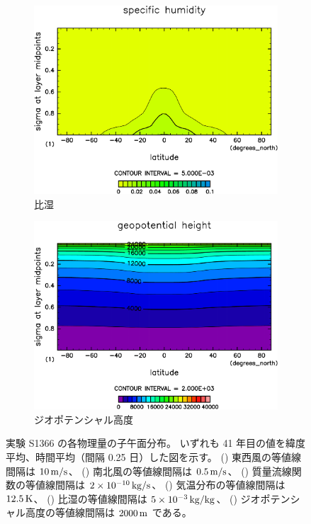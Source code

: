 \documentclass[body]{subfiles}
\begin{document}
\begin{figure}[t]
\begin{subfigure}{.4\textwidth}
		\centering
		\includegraphics[width=\textwidth]{S1366/QH2OVap,time=14600:14965-crop-rotate.pdf}
		\caption{比湿\hmu*{[kg/kg]}}\label{S1366比湿}
	\end{subfigure}
	\begin{subfigure}{.4\textwidth}
		\centering
		\includegraphics[width=\textwidth]{S1366/Height,time=14600:14965-crop-rotate.pdf}
		\caption{ジオポテンシャル高度\hmu*{[m/s]}}\label{S1366ジオポテンシャル高度}
	\end{subfigure}
	\caption[実験 S1366 の各物理量の子午面分布]{
		実験 S1366 の各物理量の子午面分布。
		いずれも 41 年目の値を緯度平均、時間平均（間隔 0.25 日）した図を示す。
		() 東西風の等値線間隔は \(10\hmu{m/s}\)、
		() 南北風の等値線間隔は \(0.5\hmu{m/s}\)、
		() 質量流線関数の等値線間隔は \(2\hme{-10}\hmu{kg/s}\)、
		() 気温分布の等値線間隔は \(12.5\hmu{K}\)、
		() 比湿の等値線間隔は \(5\hme{-3}\hmu{kg/kg}\)、
		() ジオポテンシャル高度の等値線間隔は \(2000\hmu{m}\) である。
	}\label{S1366}
\end{figure}
\end{document}
